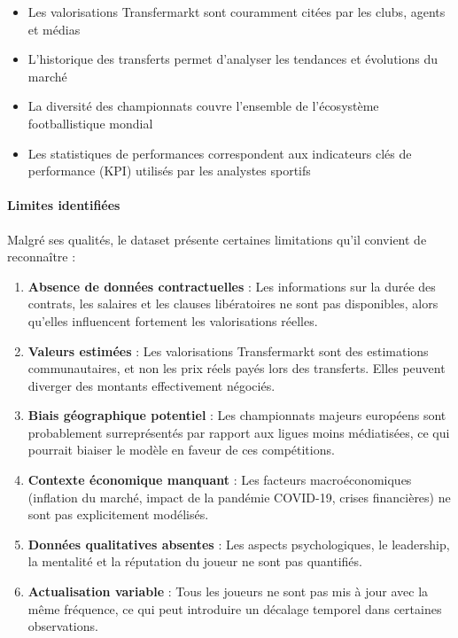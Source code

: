 \documentclass[12pt,a4paper]{article}
\begin{document}
\begin{itemize}[leftmargin=*]
    \item Les valorisations Transfermarkt sont couramment citées par les clubs, agents et médias
    \item L'historique des transferts permet d'analyser les tendances et évolutions du marché
    \item La diversité des championnats couvre l'ensemble de l'écosystème footballistique mondial
    \item Les statistiques de performances correspondent aux indicateurs clés de performance (KPI) utilisés par les analystes sportifs
\end{itemize}

\paragraph{Limites identifiées}

Malgré ses qualités, le dataset présente certaines limitations qu'il convient de reconnaître :

\begin{enumerate}[leftmargin=*]
    \item \textbf{Absence de données contractuelles} : Les informations sur la durée des contrats, les salaires et les clauses libératoires ne sont pas disponibles, alors qu'elles influencent fortement les valorisations réelles.
    
    \item \textbf{Valeurs estimées} : Les valorisations Transfermarkt sont des estimations communautaires, et non les prix réels payés lors des transferts. Elles peuvent diverger des montants effectivement négociés.
    
    \item \textbf{Biais géographique potentiel} : Les championnats majeurs européens sont probablement surreprésentés par rapport aux ligues moins médiatisées, ce qui pourrait biaiser le modèle en faveur de ces compétitions.
    
    \item \textbf{Contexte économique manquant} : Les facteurs macroéconomiques (inflation du marché, impact de la pandémie COVID-19, crises financières) ne sont pas explicitement modélisés.
    
    \item \textbf{Données qualitatives absentes} : Les aspects psychologiques, le leadership, la mentalité et la réputation du joueur ne sont pas quantifiés.
    
    \item \textbf{Actualisation variable} : Tous les joueurs ne sont pas mis à jour avec la même fréquence, ce qui peut introduire un décalage temporel dans certaines observations.
\end{enumerate}
\end{document}
